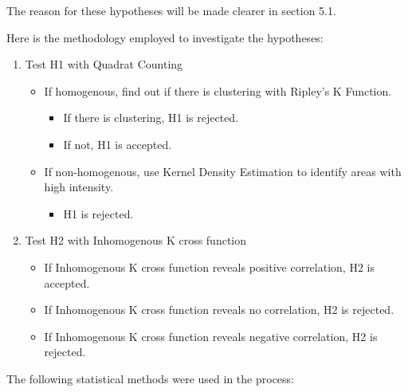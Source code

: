 \documentclass[]{article}
\providecommand{\tightlist}{%
  \setlength{\itemsep}{0pt}\setlength{\parskip}{0pt}}
\begin{document}
The reason for these hypotheses will be made clearer in section 5.1.

Here is the methodology employed to investigate the hypotheses:

\begin{enumerate}
\def\labelenumi{\arabic{enumi}.}
\tightlist
\item
  Test H1 with Quadrat Counting

  \begin{itemize}
  \tightlist
  \item
    If homogenous, find out if there is clustering with Ripley's K
    Function.

    \begin{itemize}
    \tightlist
    \item
      If there is clustering, H1 is rejected.
    \item
      If not, H1 is accepted.
    \end{itemize}
  \item
    If non-homogenous, use Kernel Density Estimation to identify areas
    with high intensity.

    \begin{itemize}
    \tightlist
    \item
      H1 is rejected.
    \end{itemize}
  \end{itemize}
\item
  Test H2 with Inhomogenous K cross function

  \begin{itemize}
  \tightlist
  \item
    If Inhomogenous K cross function reveals positive correlation, H2 is
    accepted.
  \item
    If Inhomogenous K cross function reveals no correlation, H2 is
    rejected.
  \item
    If Inhomogenous K cross function reveals negative correlation, H2 is
    rejected.
  \end{itemize}
\end{enumerate}

The following statistical methods were used in the process:
\end{document}
